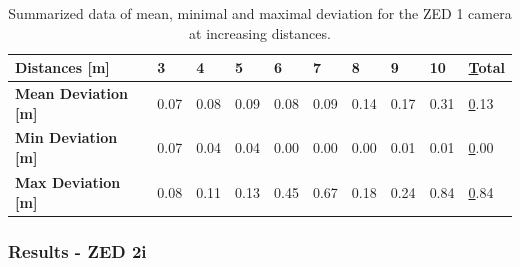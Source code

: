 

\begin{table}[h]
	\centering
	\begin{tabular}{|l|l|l|l|l|l|l|l|l|l|}
		\hline
		\textbf{Distances {[}m{]}}      & 3    & 4    & 5    & 6    & 7    & 8    & 9    & 10   & {\ul Total} \\ \hline
		\textbf{Mean Deviation {[}m{]}} & 0.07 & 0.08 & 0.09 & 0.08 & 0.09 & 0.14 & 0.17 & 0.31 & {\ul 0.13}  \\ \hline
		\textbf{Min Deviation {[}m{]}}  & 0.07 & 0.04 & 0.04 & 0.00 & 0.00 & 0.00 & 0.01 & 0.01 & {\ul 0.00}  \\ \hline
		\textbf{Max Deviation {[}m{]}}  & 0.08 & 0.11 & 0.13 & 0.45 & 0.67 & 0.18 & 0.24 & 0.84 & {\ul 0.84}  \\ \hline
	\end{tabular}
	\caption{Summarized data of mean, minimal and maximal deviation for the ZED 1 camera at increasing distances.}
	\label{tab:resultsZed1}
\end{table}




\subsubsection{Results - ZED 2i}

